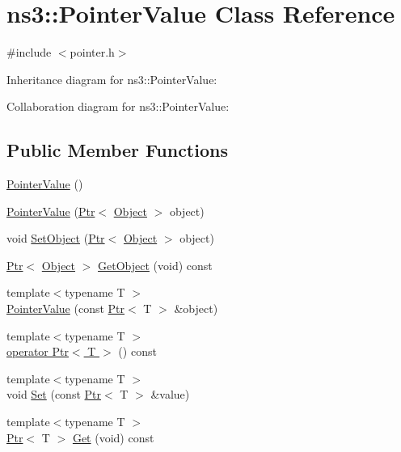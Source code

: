 \hypertarget{classns3_1_1PointerValue}{}\section{ns3\+:\+:Pointer\+Value Class Reference}
\label{classns3_1_1PointerValue}


{\ttfamily \#include $<$pointer.\+h$>$}



Inheritance diagram for ns3\+:\+:Pointer\+Value\+:


Collaboration diagram for ns3\+:\+:Pointer\+Value\+:
\subsection*{Public Member Functions}
\begin{DoxyCompactItemize}
\item 
\hyperlink{classns3_1_1PointerValue_aac3ba28e2459fa070014d355b6248683}{Pointer\+Value} ()
\item 
\hyperlink{classns3_1_1PointerValue_a8998670a8913573ab5aa5f5b9c9fb428}{Pointer\+Value} (\hyperlink{classns3_1_1Ptr}{Ptr}$<$ \hyperlink{classns3_1_1Object}{Object} $>$ object)
\item 
void \hyperlink{classns3_1_1PointerValue_ade775ce709eecc8b1894e884117367d3}{Set\+Object} (\hyperlink{classns3_1_1Ptr}{Ptr}$<$ \hyperlink{classns3_1_1Object}{Object} $>$ object)
\item 
\hyperlink{classns3_1_1Ptr}{Ptr}$<$ \hyperlink{classns3_1_1Object}{Object} $>$ \hyperlink{classns3_1_1PointerValue_a53d0f9f5c538ea6120c96a1ecb1344a8}{Get\+Object} (void) const 
\item 
{\footnotesize template$<$typename T $>$ }\\\hyperlink{classns3_1_1PointerValue_a42c7cd2e2094317264fde9ca943e28be}{Pointer\+Value} (const \hyperlink{classns3_1_1Ptr}{Ptr}$<$ T $>$ \&object)
\item 
{\footnotesize template$<$typename T $>$ }\\\hyperlink{classns3_1_1PointerValue_abcd757341584db09c7ec725ee1b4e97d}{operator Ptr$<$ T $>$} () const 
\item 
{\footnotesize template$<$typename T $>$ }\\void \hyperlink{classns3_1_1PointerValue_a8f31cb178bd362af323395ce809a79de}{Set} (const \hyperlink{classns3_1_1Ptr}{Ptr}$<$ T $>$ \&value)
\item 
{\footnotesize template$<$typename T $>$ }\\\hyperlink{classns3_1_1Ptr}{Ptr}$<$ T $>$ \hyperlink{classns3_1_1PointerValue_ae8e90fe3c0810cd6e4e1b1ba31f52a66}{Get} (void) const 

\end{DoxyCompactItemize}
